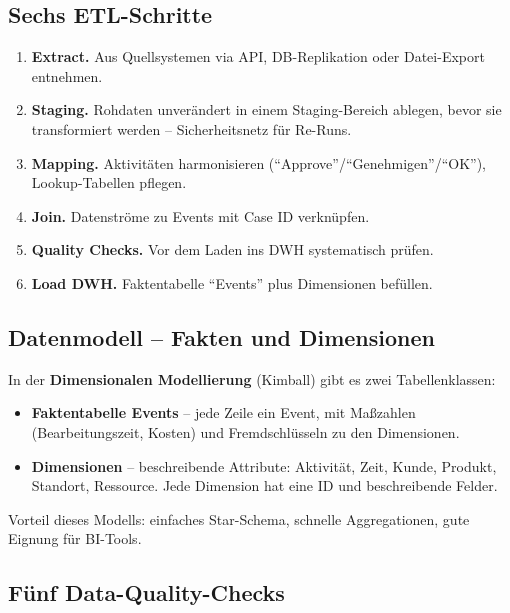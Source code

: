 \documentclass[11pt,a4paper,oneside]{article}
\newcommand{\fachbegriff}[1]{\textbf{#1}}
\begin{document}
\subsection{Sechs ETL-Schritte}

\begin{enumerate}
  \item \fachbegriff{Extract.} Aus Quellsystemen via API, DB-Replikation oder Datei-Export entnehmen.
  \item \fachbegriff{Staging.} Rohdaten unverändert in einem Staging-Bereich ablegen, bevor sie transformiert werden -- Sicherheitsnetz für Re-Runs.
  \item \fachbegriff{Mapping.} Aktivitäten harmonisieren (``Approve''/``Genehmigen''/``OK''), Lookup-Tabellen pflegen.
  \item \fachbegriff{Join.} Datenströme zu Events mit Case ID verknüpfen.
  \item \fachbegriff{Quality Checks.} Vor dem Laden ins DWH systematisch prüfen.
  \item \fachbegriff{Load DWH.} Faktentabelle ``Events'' plus Dimensionen befüllen.
\end{enumerate}

\subsection{Datenmodell -- Fakten und Dimensionen}

In der \fachbegriff{Dimensionalen Modellierung} (Kimball) gibt es zwei Tabellenklassen:

\begin{itemize}
  \item \fachbegriff{Faktentabelle Events} -- jede Zeile ein Event, mit Maßzahlen (Bearbeitungs\-zeit, Kosten) und Fremdschlüsseln zu den Dimensionen.
  \item \fachbegriff{Dimensionen} -- beschreibende Attribute: Aktivität, Zeit, Kunde, Produkt, Standort, Ressource. Jede Dimension hat eine ID und beschreibende Felder.
\end{itemize}

Vorteil dieses Modells: einfaches Star-Schema, schnelle Aggregationen, gute Eignung für BI-Tools.

\subsection{Fünf Data-Quality-Checks}
\end{document}
